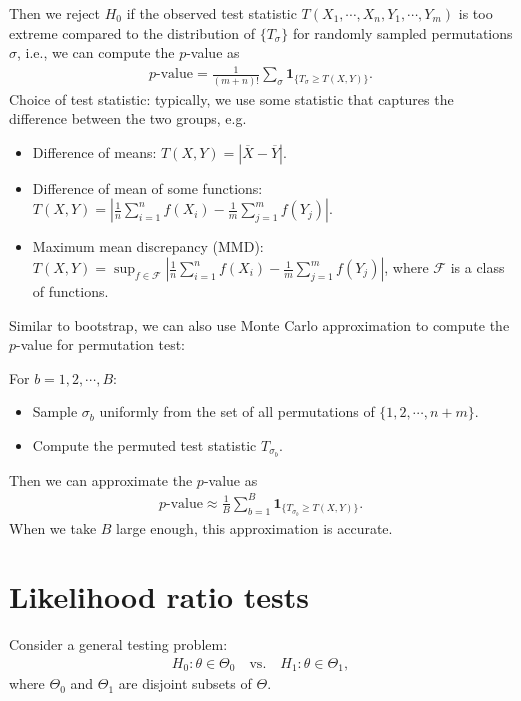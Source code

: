 \documentclass[11pt,letterpaper]{article}
\numberwithin{assumption}{lecture}
\numberwithin{theorem}{lecture}
\numberwithin{proposition}{lecture}
\numberwithin{lemma}{lecture}
\numberwithin{claim}{lecture}
\numberwithin{corollary}{lecture}
\numberwithin{definition}{lecture}
\numberwithin{conjecture}{lecture}
\numberwithin{remark}{lecture}
\numberwithin{example}{lecture}
\numberwithin{equation}{lecture}
\begin{document}
Then we reject $H_0$ if the observed test statistic $T(X_1, \cdots, X_n, Y_1, \cdots, Y_m)$ is too extreme compared to the distribution of $\{T_\sigma\}$ for randomly sampled permutations $\sigma$, i.e., we can compute the $p$-value as
\begin{align*}
  p\mbox{-value} = \frac{1}{(m + n)!} \sum_{\sigma} \bm{1}_{\{ T_\sigma \geq T(X, Y) \}}.
\end{align*}
Choice of test statistic: typically, we use some statistic that captures the difference between the two groups, e.g.
\begin{itemize}
  \item Difference of means: $T(X, Y) = |\overline{X} - \overline{Y}|$.
  \item Difference of mean of some functions: $T(X, Y) = |\frac{1}{n} \sum_{i=1}^n f(X_i) - \frac{1}{m} \sum_{j=1}^m f(Y_j)|$.
  \item Maximum mean discrepancy (MMD): $T(X, Y) = \sup_{f \in \mathcal{F}} |\frac{1}{n} \sum_{i=1}^n f(X_i) - \frac{1}{m} \sum_{j=1}^m f(Y_j)|$, where $\mathcal{F}$ is a class of functions.
\end{itemize}
Similar to bootstrap, we can also use Monte Carlo approximation to compute the $p$-value for permutation test:

\bigskip

For $b = 1, 2, \cdots, B$:
\begin{itemize}
  \item Sample $\sigma_b$ uniformly from the set of all permutations of $\{1, 2, \cdots, n + m\}$.
  \item Compute the permuted test statistic $T_{\sigma_b}$.
\end{itemize}
Then we can approximate the $p$-value as
\begin{align*}
  p\mbox{-value} \approx \frac{1}{B} \sum_{b=1}^B \bm{1}_{\{ T_{\sigma_b} \geq T(X, Y) \}}.
\end{align*}
When we take $B$ large enough, this approximation is accurate.

\section{Likelihood ratio tests}
Consider a general testing problem:
\begin{align*}
  H_0: \theta \in \Theta_0 \quad \text{vs.} \quad H_1: \theta \in \Theta_1,
\end{align*}
where $\Theta_0$ and $\Theta_1$ are disjoint subsets of $\Theta$.
\end{document}
